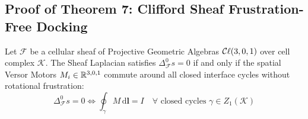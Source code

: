 \subsection{Proof of Theorem 7: Clifford Sheaf Frustration-Free Docking}
\begin{theorem}
\label{thm:sheaf_docking}
Let $\mathcal{F}$ be a cellular sheaf of Projective Geometric Algebras $\mathcal{C}\ell(3,0,1)$ over cell complex $\mathcal{K}$. The Sheaf Laplacian satisfies $\Delta_{\mathcal{F}}^0 s = 0$ if and only if the spatial Versor Motors $M_i \in \mathbb{R}^{3,0,1}$ commute around all closed interface cycles without rotational frustration:
\begin{equation}
    \Delta_{\mathcal{F}}^0 s = 0 \iff \oint_{\gamma} M \, \mathrm{d}\mathbf{l} = I \quad \forall \text{ closed cycles } \gamma \in Z_1(\mathcal{K})
\end{equation}
\end{theorem}

